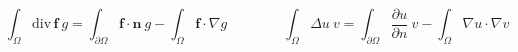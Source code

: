\documentclass[a4paper]{article}
\theoremstyle{break}
\newcommand{\fv}{\mathbf{f}}
\newcommand{\nv}{\mathbf{n}}
\begin{document}
\begin{equation*}
\boxed{
\int_\Omega \text{div}\,\fv\ g=\int_{\partial\Omega}\fv\cdot\nv\ g-\int_\Omega \fv\cdot\nabla g} \qquad \qquad
\boxed{
\int_\Omega \Delta u\ v=\int_{\partial\Omega}\frac{\partial u}{\partial n}\ v-\int_\Omega \nabla u\cdot\nabla v}
\end{equation*}

\bigskip

\raggedright
\footnotesize
\begin{multicols*}{2}

\setlength{\columnseprule}{1pt}
\def\columnseprulecolor{\color{red}}
\setlength{\premulticols}{1pt}
\setlength{\postmulticols}{1pt}
\setlength{\multicolsep}{1pt}
\setlength{\columnsep}{2pt}






\end{multicols*}
\end{document}

